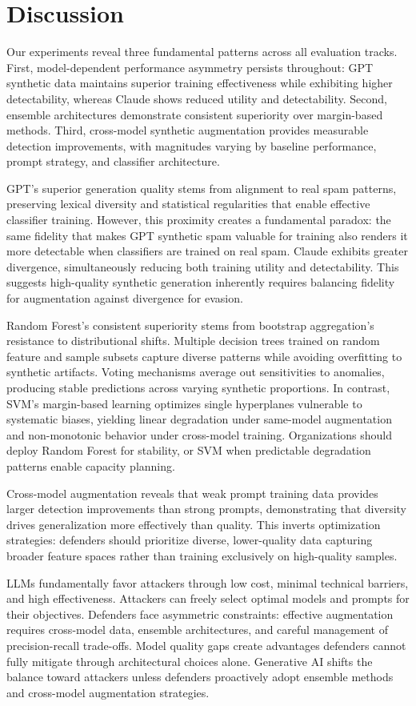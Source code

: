 \section{Discussion}
\label{sec:discussion}

Our experiments reveal three fundamental patterns across all evaluation tracks. First, model-dependent performance asymmetry persists throughout: GPT synthetic data maintains superior training effectiveness while exhibiting higher detectability, whereas Claude shows reduced utility and detectability. Second, ensemble architectures demonstrate consistent superiority over margin-based methods. Third, cross-model synthetic augmentation provides measurable detection improvements, with magnitudes varying by baseline performance, prompt strategy, and classifier architecture.

GPT's superior generation quality stems from alignment to real spam patterns, preserving lexical diversity and statistical regularities that enable effective classifier training. However, this proximity creates a fundamental paradox: the same fidelity that makes GPT synthetic spam valuable for training also renders it more detectable when classifiers are trained on real spam. Claude exhibits greater divergence, simultaneously reducing both training utility and detectability. This suggests high-quality synthetic generation inherently requires balancing fidelity for augmentation against divergence for evasion.

Random Forest's consistent superiority stems from bootstrap aggregation's resistance to distributional shifts. Multiple decision trees trained on random feature and sample subsets capture diverse patterns while avoiding overfitting to synthetic artifacts. Voting mechanisms average out sensitivities to anomalies, producing stable predictions across varying synthetic proportions. In contrast, SVM's margin-based learning optimizes single hyperplanes vulnerable to systematic biases, yielding linear degradation under same-model augmentation and non-monotonic behavior under cross-model training. Organizations should deploy Random Forest for stability, or SVM when predictable degradation patterns enable capacity planning.

Cross-model augmentation reveals that weak prompt training data provides larger detection improvements than strong prompts, demonstrating that diversity drives generalization more effectively than quality. This inverts optimization strategies: defenders should prioritize diverse, lower-quality data capturing broader feature spaces rather than training exclusively on high-quality samples.

LLMs fundamentally favor attackers through low cost, minimal technical barriers, and high effectiveness. Attackers can freely select optimal models and prompts for their objectives. Defenders face asymmetric constraints: effective augmentation requires cross-model data, ensemble architectures, and careful management of precision-recall trade-offs. Model quality gaps create advantages defenders cannot fully mitigate through architectural choices alone. Generative AI shifts the balance toward attackers unless defenders proactively adopt ensemble methods and cross-model augmentation strategies.
